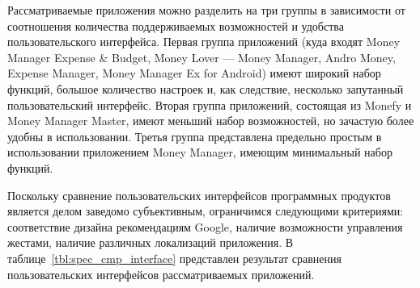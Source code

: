 Рассматриваемые приложения можно разделить на три группы в
зависимости от соотношения количества поддерживаемых
возможностей и удобства пользовательского интерфейса.
Первая группа приложений (куда входят Money Manager Expense \& Budget,
Money Lover --- Money Manager, Andro Money, Expense Manager,
Money Manager Ex for Android)
имеют широкий набор функций, большое количество настроек
и, как следствие, несколько запутанный пользовательский интерфейс.
Вторая группа приложений, состоящая из Monefy и Money Manager Master,
имеют меньший набор возможностей, но зачастую более удобны в использовании.
Третья группа представлена предельно простым в использовании приложением Money Manager,
имеющим минимальный набор функций.

Поскольку сравнение пользовательских интерфейсов программных продуктов
является делом заведомо субъективным, ограничимся следующими критериями:
соответствие дизайна рекомендациям Google, наличие возможности управления жестами,
наличие различных локализаций приложения.
В таблице~\ref{tbl:spec_cmp_interface} представлен результат сравнения
пользовательских интерфейсов рассматриваемых приложений.


